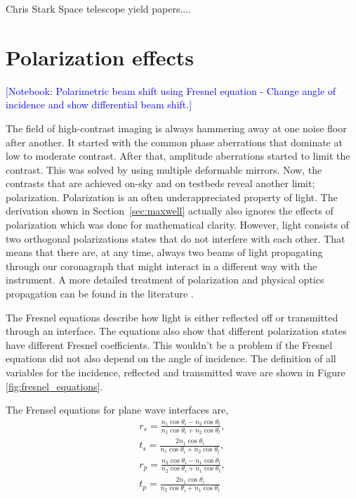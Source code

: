 \documentclass[letterpaper]{ar-1col}
\newcommand{\notebooksuggestion}[1]{\textcolor{blue}{[Notebook: #1]}}
\begin{document}
Chris Stark Space telescope yield papers...\citep{Stark14,Stark24}.

\lipsum[2-4]



\section{Polarization effects} 

\notebooksuggestion{Polarimetric beam shift using Fresnel equation - Change angle of incidence and show differential beam shift.}

The field of high-contrast imaging is always hammering away at one noise floor after another. It started with the common phase aberrations that dominate at low to moderate contrast. After that, amplitude aberrations started to limit the contrast. This was solved by using multiple deformable mirrors. Now, the contrasts that are achieved on-sky and on testbeds reveal another limit; polarization. Polarization is an often underappreciated property of light. The derivation shown in Section~\ref{sec:maxwell} actually also ignores the effects of polarization which was done for mathematical clarity. However, light consists of two orthogonal polarizations states that do not interfere with each other. That means that there are, at any time, always two beams of light propagating through our coronagraph that might interact in a different way with the instrument. A more detailed treatment of polarization and physical optics propagation can be found in the literature \citep{McLeod14}.

The Fresnel equations describe how light is either reflected off or transmitted through an interface. The equations also show that different polarization states have different Fresnel coefficients. This wouldn't be a problem if the Fresnel equations did not also depend on the angle of incidence. The definition of all variables for the incidence, reflected and transmitted wave are shown in Figure \ref{fig:fresnel_equations}.

The Frensel equations for plane wave interfaces are,
\begin{align}
r_s = \frac{n_1\cos{\theta_i} - n_2\cos{\theta_t}}{n_1\cos{\theta_i} + n_2\cos{\theta_t}},\\
t_s = \frac{2n_1 \cos{\theta_i}}{n_1\cos{\theta_i} + n_2\cos{\theta_t}},\\
r_p = \frac{n_2\cos{\theta_i} - n_1\cos{\theta_t}}{n_2\cos{\theta_i} + n_1\cos{\theta_t}},\\
t_p = \frac{2n_1 \cos{\theta_i}}{n_2\cos{\theta_i} + n_1\cos{\theta_t}}
\end{align}
\end{document}
